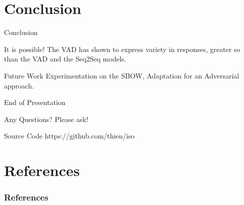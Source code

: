 \documentclass[aspectratio=169, 11pt]{beamer}
\begin{document}
\section{Conclusion}
\begin{frame}{Conclusion}
  \begin{block}{It is possible!}
    The VAD has shown to express variety in responses, greater so than the VAD and the Seq2Seq models.
  \end{block}
  \begin{block}{Future Work}
    Experimentation on the SBOW, Adaptation for an Adversarial approach.
  \end{block}
\end{frame} 

\begin{frame}{End of Presentation}
  \begin{block}{Any Questions?}
    Please ask!
  \end{block}
  \begin{block}{Source Code}
    https://github.com/thien/iso
  \end{block}
\end{frame}

\section*{References}
\begin{frame}[allowframebreaks]
  \frametitle{References} 
  \small
  
   
\end{frame}
\end{document}
